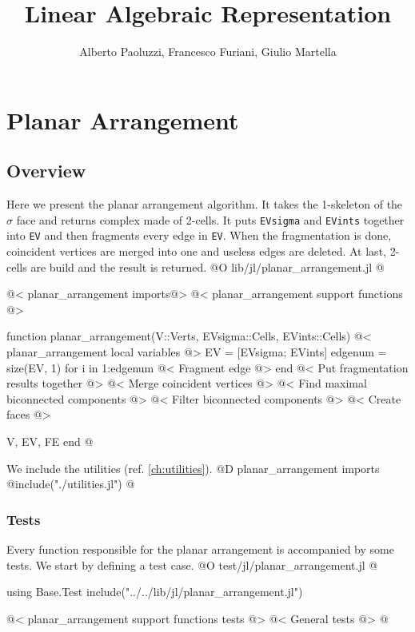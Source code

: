 \documentclass[10pt]{book}
\author{Alberto Paoluzzi, Francesco Furiani, Giulio Martella}
\title{Linear Algebraic Representation}
\begin{document}
\frontmatter
\maketitle
\tableofcontents





\mainmatter

\chapter{Planar Arrangement}

\section{Overview}
Here we present the planar arrangement algorithm. It takes the 1-skeleton of the $\sigma$ face and returns complex made of 2-cells.
It puts \texttt{EVsigma} and \texttt{EVints} together into \texttt{EV} and then fragments every edge in \texttt{EV}. 
When the fragmentation is done, coincident vertices are merged into one and useless edges are deleted. At last,
2-cells are build and the result is returned.
@O lib/jl/planar_arrangement.jl
@{@< planar\_arrangement imports@>
@< planar\_arrangement support functions @>

function planar_arrangement(V::Verts, EVsigma::Cells, EVints::Cells)
    @< planar\_arrangement local variables @>
    EV = [EVsigma; EVints]
    edgenum = size(EV, 1)
    for i in 1:edgenum
        @< Fragment edge @>
    end
    @< Put fragmentation results together @>
    @< Merge coincident vertices @>
    @< Find maximal biconnected components @>
    @< Filter biconnected components @>
    @< Create faces @>

    V, EV, FE
end 
@}
We include the utilities (ref. \ref{ch:utilities}).
@D planar\_arrangement imports
@{include("./utilities.jl")
@}
\subsection{Tests}
Every function responsible for the planar arrangement is accompanied by some tests.
We start by defining a test case.
@O test/jl/planar_arrangement.jl
@{using Base.Test
include("../../lib/jl/planar_arrangement.jl")

@< planar\_arrangement support functions tests @>
@< General tests @>
@}
\end{document}
